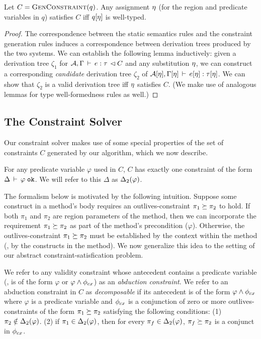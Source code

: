 \begin{theorem}
\label{thm:constraint-generation-sc}
Let $C = \textsc{GenConstraint}(q)$.
Any assignment $\eta$ (for the region and predicate variables in $q$)
satisfies $C$ iff $q[\eta]$ is well-typed.
\end{theorem}
\begin{proof}
The correspondence between the static semantics rules and the constraint generation
rules induces a correspondence between derivation trees produced by the
two systems.
We can establish the following lemma inductively:
given a derivation tree $\zeta_1$ for
${{\mathcal{A}},\Gamma} \, \vdash \, {e} : {\tau} \, \lhd {C}$
and any substitution $\eta$,
we can construct a corresponding \emph{candidate} derivation
tree $\zeta_2$ of ${\mathcal{A}}[\eta],\Gamma[\eta]\,\vdash\,e[\eta]:\tau[\eta]$.
We can show that $\zeta_2$ is a valid derivation tree iff $\eta$ satisfies $C$.
(We make use of analogous lemmas for type well-formedness rules as well.)
\end{proof}

\subsection{The Constraint Solver}

Our constraint solver makes use of some special properties of the set of constraints $C$
generated by our algorithm, which we now describe.

For any predicate variable $\varphi$ used in $C$, $C$ has exactly one constraint
of the form $\Delta\,\vdash\,\varphi \; \texttt{ok}$. We will refer to this $\Delta$ as
${\Delta_2}(\varphi)$.

The formalism below is motivated by the following intuition.
Suppose some construct in a method's body requires an outlives-constraint
$\pi_1 \succeq \pi_2$ to hold. If both $\pi_1$ and $\pi_2$ are region parameters
of the method, then we can incorporate the requirement $\pi_1 \succeq \pi_2$ 
as part of the method's precondition ($\varphi$). Otherwise, the outlives-constraint
$\pi_1 \succeq \pi_2$ must be established by the context within the method
(\eg, by the  constructs in the method).
We now generalize this idea to the setting of our abstract constraint-satisfication
problem.

We refer to any validity constraint whose antecedent contains a predicate variable
(\ie, is of the form $\varphi$ or $\varphi \wedge \phi_{cx}$) as an \emph{abduction
constraint}. We refer to an abduction constraint in $C$ as \emph{decomposable}
if its antecedent is of the form $\varphi \wedge \phi_{cx}$ where $\varphi$ is a predicate variable and
$\phi_{cx}$ is a conjunction of zero or more outlives-constraints of the form
$\pi_1 \succeq \pi_2$ satisfying the following conditions:
(1) $\pi_2 \notin {\Delta_2}(\varphi)$.
(2) if $\pi_1 \in {\Delta_2}(\varphi)$, then for
every $\pi_f \in {\Delta_2}(\varphi)$, $\pi_f \succeq \pi_2$ is
a conjunct in $\phi_{cx}$.

